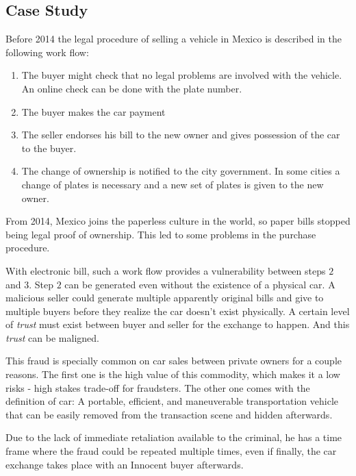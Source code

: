 \subsection{Case Study}
Before 2014 the legal procedure of selling a vehicle in Mexico is described in the following
work flow:
\begin{enumerate}
    \item The buyer might check that no legal problems are involved with the vehicle. 
          An online check can be done with the plate number. 
    \item The buyer makes the car payment
    \item The seller endorses his bill to the new owner and gives possession of the car 
    to the buyer.
    \item The change of ownership is notified to the city government. In some cities a 
        change of plates is necessary and a new set of plates is given to the new owner.
\end{enumerate}

From 2014, Mexico joins the paperless culture in the world, so paper bills stopped being 
legal proof of ownership. This led to some problems in the purchase procedure.

With electronic bill, such a work flow provides a vulnerability between steps $2$ and $3$. 
Step $2$ can be generated even without the existence of a physical car. A malicious seller 
could generate multiple apparently original bills and give to multiple buyers before 
they realize the car doesn't exist physically. A certain level of \textit{trust} must 
exist between buyer and seller for the exchange to happen. And this \textit{trust} can be 
maligned. 

This fraud is specially common on car sales between private owners for a couple reasons. 
The first one is the high value of this commodity, which makes it a low risks - high stakes 
trade-off for fraudsters. The other one comes with the definition of car: A portable, efficient, 
and maneuverable transportation vehicle that can be easily removed from the transaction scene 
and hidden afterwards.

Due to the lack of immediate retaliation available to the criminal, he has a time frame where 
the fraud could be repeated multiple times, even if finally, the car exchange takes place with 
an Innocent buyer afterwards.

